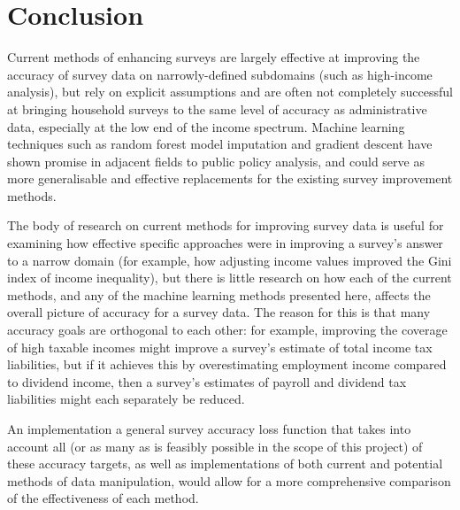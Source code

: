 \documentclass[twocolumn]{article}
\begin{document}
\section{Conclusion}

Current methods of enhancing surveys are largely effective at improving the accuracy of survey data on narrowly-defined subdomains (such as high-income analysis), but rely on explicit assumptions and are often not completely successful at bringing household surveys to the same level of accuracy as administrative data, especially at the low end of the income spectrum. Machine learning techniques such as random forest model imputation and gradient descent have shown promise in adjacent fields to public policy analysis, and could serve as more generalisable and effective replacements for the existing survey improvement methods.

The body of research on current methods for improving survey data is useful for examining how effective specific approaches were in improving a survey's answer to a narrow domain (for example, how adjusting income values improved the Gini index of income inequality), but there is little research on how each of the current methods, and any of the machine learning methods presented here, affects the overall picture of accuracy for a survey data. The reason for this is that many accuracy goals are orthogonal to each other: for example, improving the coverage of high taxable incomes might improve a survey's estimate of total income tax liabilities, but if it achieves this by overestimating employment income compared to dividend income, then a survey's estimates of payroll and dividend tax liabilities might each separately be reduced.

An implementation a general survey accuracy loss function that takes into account all (or as many as is feasibly possible in the scope of this project) of these accuracy targets, as well as implementations of both current and potential methods of data manipulation, would allow for a more comprehensive comparison of the effectiveness of each method.



    
\end{document}
